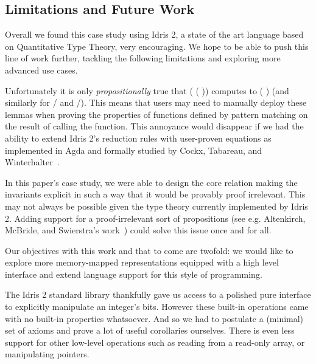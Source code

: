 \documentclass{article}
\newcommand{\idris}{Idris 2}
\begin{document}

\subsection{Limitations and Future Work}

Overall we found this case study using \idris{}, a state of the art language
based on Quantitative Type Theory, very encouraging.
%
We hope to be able to push this line of work further, tackling the following
limitations and exploring more advanced use cases.

Unfortunately it is only \emph{propositionally} true that
( (  ))
computes to (  ) (and similarly for
/ and /).
%
This means that users may need to manually deploy these lemmas when proving the
properties of functions defined by pattern matching on the result of calling the
 function.
%
This annoyance would disappear if we had the ability to extend \idris{}'s reduction rules
with user-proven equations as implemented in Agda and formally studied
by Cockx, Tabareau, and Winterhalter~\cite{DBLP:journals/pacmpl/CockxTW21}.

In this paper's case study, we were able to design the core 
relation making the invariants explicit in such a way that it would be provably
proof irrelevant.
%
This may not always be possible given the type theory currently implemented by
\idris{}. Adding support for a proof-irrelevant sort of propositions (see e.g.
Altenkirch, McBride, and Swierstra's work~\cite{DBLP:conf/plpv/AltenkirchMS07})
could solve this issue once and for all.

Our objectives with this work and that to come are twofold: we would like to
explore more memory-mapped representations equipped with a high level interface
and extend language support for this style of programming.

The \idris{} standard library thankfully gave us access to a polished pure interface
to explicitly manipulate an integer's bits.
%
However these built-in operations came with no built-in properties whatsoever.
%
And so we had to postulate a (minimal) set of axioms and prove a lot of useful
corollaries ourselves.
%
There is even less support for other low-level operations such as reading from
a read-only array, or manipulating pointers.
\end{document}
